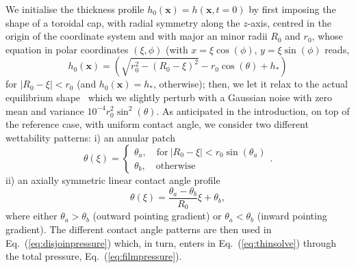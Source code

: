 \documentclass[twoside,twocolumn,9pt]{article}
\begin{document}
We initialise the thickness profile $h_0(\mathbf{x})=h(\mathbf{x}, t=0)$ by first imposing the shape of a toroidal cap, with radial symmetry along the $z$-axis, centred in the origin of the coordinate system
and with major an minor radii $R_0$ and $r_0$,
whose equation in polar coordinates $(\xi, \phi)$ (with $x = \xi \cos(\phi)$, $y=\xi \sin(\phi)$ reads,
\begin{equation}\label{eq:torus}
h_0(\mathbf{x})=\left(\sqrt{r_0^2 - \left(R_0-\xi\right)^2} - r_0\cos(\theta) + h_{\ast}\right)
\end{equation}
for $|R_0-\xi|<r_0$ (and $h_0(\mathbf{x})=h_{\ast}$, otherwise); then, we let it relax to the actual 
equilibrium shape~\cite{diezBreakupFluidRivulets2009} which we slightly perturb with a Gaussian noise with zero mean and variance $10^{-4}r_0^2 \sin^2(\theta)$. 
As anticipated in the introduction, on top of the reference case, with uniform contact angle, we consider two different wettability patterns: i) an annular patch 
\begin{equation}\label{eq:theta_band}
    \theta(\xi) =\begin{cases}
        \theta_a,\quad \text{for}~|R_0-\xi|< r_0\sin(\theta_a) \\
        \theta_b,\quad \text{otherwise}
    \end{cases}.
\end{equation}
ii) an axially symmetric linear contact angle profile
\begin{equation}\label{eq:theta_grad}
    \theta(\xi) = \frac{\theta_{a}-\theta_{b}}{R_0} \xi + \theta_{b},
\end{equation}
where either $\theta_{a} > \theta_{b}$ (outward pointing gradient) or $\theta_a < \theta_b$ (inward pointing
 gradient).
The different contact angle patterns are then used in Eq.~(\ref{eq:disjoinpressure}) which, in turn, enters in Eq.~(\ref{eq:thinsolve}) through the total pressure, Eq.~(\ref{eq:filmpressure}).
\end{document}
